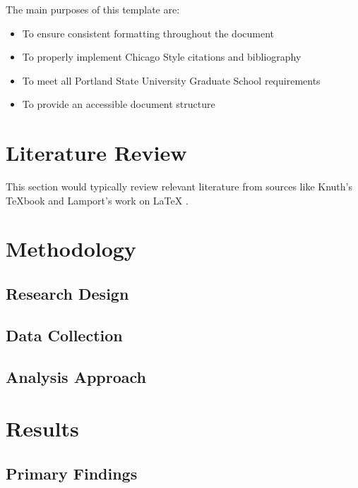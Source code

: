 \documentclass{psu-thesis}
\begin{document}
The main purposes of this template are:

\begin{itemize}
    \item To ensure consistent formatting throughout the document
    \item To properly implement Chicago Style citations and bibliography
    \item To meet all Portland State University Graduate School requirements
    \item To provide an accessible document structure
\end{itemize}

\lipsum[4-5]

\chapter{Literature Review}

\lipsum[6-8]

This section would typically review relevant literature from sources like Knuth's \TeX{}book \autocite{knuth} and Lamport's work on \LaTeX{} \autocite{lamport}.

\chapter{Methodology}

\lipsum[9-11]

\section{Research Design}
\lipsum[12]

\section{Data Collection}
\lipsum[13]

\section{Analysis Approach}
\lipsum[14]

\chapter{Results}

\lipsum[15-17]

\section{Primary Findings}
\lipsum[18]
\end{document}
